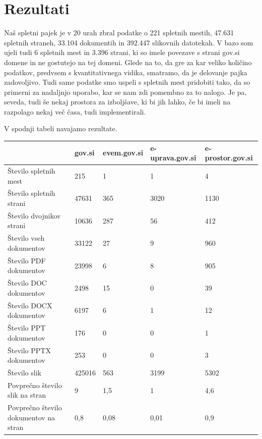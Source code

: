 \documentclass[conference]{IEEEtran}
\begin{document}
	\section{Rezultati}
	Naš spletni pajek je v 20 urah zbral podatke o 221 spletnih mestih, 47.631 spletnih straneh, 33.104 dokumentih in 392.447 slikovnih datotekah. V bazo som ujeli tudi 6 spletnih mest in 3.396 strani, ki so imele povezave s strani gov.si domene in ne gostutejo na tej domeni. Glede na to, da gre za kar veliko količino podatkov, predvsem s kvantitativnega vidika, smatramo, da je delovanje pajka zadovoljivo. Tudi same podatke smo uspeli s spletnih mest pridobiti tako, da so primerni za nadaljnjo uporabo, kar se nam zdi pomembno za to nalogo. Je pa, seveda, tudi še nekaj prostora za izboljšave, ki bi jih lahko, če bi imeli na razpolago nekaj več časa, tudi implementirali.
	
	V spodnji tabeli navajamo rezultate.
	
		

\begin{flushleft}
\begin{tabular}{ |l|l|l|l|l| } 
 \hline
  &  gov.si & evem.gov.si & e-uprava.gov.si & e-prostor.gov.si  \\
 \hline
 Število spletnih mest &  215 & 1 & 1 & 4  \\ 
 \hline
 Število spletnih strani &  47631 & 365 & 3020 & 1130  \\  
 \hline
 Število dvojnikov strani &  10636 & 287 & 56 & 412 \\
 \hline
 Število vseh dokumentov &  33122 & 27 & 9 & 960 \\
 \hline
 Število PDF dokumentov &  23998 & 6 & 8 & 905 \\
 \hline
 Število DOC dokumentov &  2498 & 15 & 0 & 39 \\
 \hline
 Število DOCX dokumentov &  6197 & 6 & 1 & 12 \\
 \hline
 Število PPT dokumentov &  176 & 0 & 0 & 1 \\
 \hline
 Število PPTX dokumentov &  253 & 0 & 0 & 3 \\
 \hline
 Število slik &  425016 & 563 & 3199 & 5302 \\
 \hline
 Povprečno število slik na stran &  9 & 1,5 & 1 & 4,6 \\
 \hline
 Povprečno število dokumentov na stran &  0,8 & 0,08 & 0,01 & 0,9 \\
 \hline
\end{tabular}
\end{flushleft}


	
	

	
	
	
	
\end{document}
